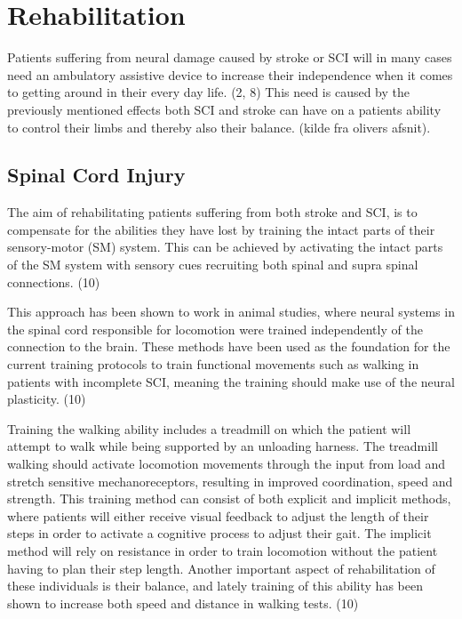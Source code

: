 \section{Rehabilitation}

Patients suffering from neural damage caused by stroke or SCI will in many cases need an ambulatory assistive device to increase their independence when it comes to getting around in their every day life. (2, 8) This need is caused by the previously mentioned effects both SCI and stroke can have on a patients ability to control their limbs and thereby also their balance. (kilde fra olivers afsnit). 

\subsection{Spinal Cord Injury}

The aim of rehabilitating patients suffering from both stroke and SCI, is to compensate for the abilities they have lost by training the intact parts of their sensory-motor (SM) system. This can be achieved by activating the intact parts of the SM system with sensory cues recruiting both spinal and supra spinal connections. (10)

This approach has been shown to work in animal studies, where neural systems in the spinal cord responsible for locomotion were trained independently of the connection to the brain. These methods have been used as the foundation for the current training protocols to train functional movements such as walking in patients with incomplete SCI, meaning the training should make use of the neural plasticity. (10)

Training the walking ability includes a treadmill on which the patient will attempt to walk while being supported by an unloading harness. The treadmill walking should activate locomotion movements through the input from load and stretch sensitive mechanoreceptors, resulting in improved coordination, speed and strength. This training method can consist of both explicit and implicit methods, where patients will either receive visual feedback to adjust the length of their steps in order to activate a cognitive process to adjust their gait. The implicit method will rely on resistance in order to train locomotion without the patient having to plan their step length. Another important aspect of rehabilitation of these individuals is their balance, and lately training of this ability has been shown to increase both speed and distance in walking tests. (10)


